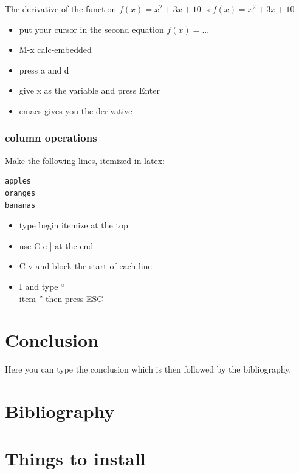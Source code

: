 \documentclass[11pt]{article}
\begin{document}
The derivative of the function $f(x) = x^2 + 3x +10$ is $f(x) = x^2 + 3 x + 10$

\begin{itemize}
\item put your cursor in the second equation $f(x)=...$
\item M-x calc-embedded
\item press a and d
\item give x as the variable and press Enter
\item emacs gives you the derivative
\end{itemize}

\subsubsection{column operations}

Make the following lines, itemized in latex:

\begin{verbatim}
apples
oranges
bananas
\end{verbatim}

\begin{itemize}
\item type begin itemize at the top
\item use C-c ] at the end
\item C-v and block the start of each line
\item I and type ``\\item '' then press ESC
\end{itemize}


\section{Conclusion}

Here you can type the conclusion which is then followed by the bibliography.

\section{Bibliography}








\newpage
\appendix


\section{Things to install}
\label{sec:install}
\end{document}
